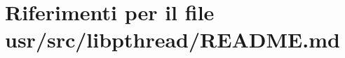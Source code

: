 \hypertarget{usr_2src_2libpthread_2README_8md}{\section{Riferimenti per il file usr/src/libpthread/\+R\+E\+A\+D\+M\+E.md}
\label{usr_2src_2libpthread_2README_8md}
}

